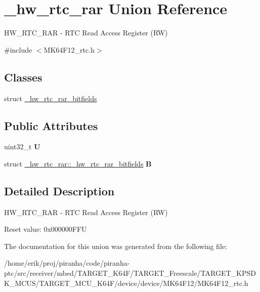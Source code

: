 \hypertarget{union__hw__rtc__rar}{}\section{\+\_\+hw\+\_\+rtc\+\_\+rar Union Reference}
\label{union__hw__rtc__rar}


H\+W\+\_\+\+R\+T\+C\+\_\+\+R\+AR -\/ R\+TC Read Access Register (RW)  




{\ttfamily \#include $<$M\+K64\+F12\+\_\+rtc.\+h$>$}

\subsection*{Classes}
\begin{DoxyCompactItemize}
\item 
struct \hyperlink{struct__hw__rtc__rar_1_1__hw__rtc__rar__bitfields}{\+\_\+hw\+\_\+rtc\+\_\+rar\+\_\+bitfields}
\end{DoxyCompactItemize}
\subsection*{Public Attributes}
\begin{DoxyCompactItemize}
\item 
uint32\+\_\+t {\bfseries U}\hypertarget{union__hw__rtc__rar_a61805dc7b156b5b3498e0d435c6ff2a7}{}\label{union__hw__rtc__rar_a61805dc7b156b5b3498e0d435c6ff2a7}

\item 
struct \hyperlink{struct__hw__rtc__rar_1_1__hw__rtc__rar__bitfields}{\+\_\+hw\+\_\+rtc\+\_\+rar\+::\+\_\+hw\+\_\+rtc\+\_\+rar\+\_\+bitfields} {\bfseries B}\hypertarget{union__hw__rtc__rar_a809f0614035c209c0d11aeaaadd1e29d}{}\label{union__hw__rtc__rar_a809f0614035c209c0d11aeaaadd1e29d}

\end{DoxyCompactItemize}


\subsection{Detailed Description}
H\+W\+\_\+\+R\+T\+C\+\_\+\+R\+AR -\/ R\+TC Read Access Register (RW) 

Reset value\+: 0x000000\+F\+FU 

The documentation for this union was generated from the following file\+:\begin{DoxyCompactItemize}
\item 
/home/erik/proj/piranha/code/piranha-\/ptc/src/receiver/mbed/\+T\+A\+R\+G\+E\+T\+\_\+\+K64\+F/\+T\+A\+R\+G\+E\+T\+\_\+\+Freescale/\+T\+A\+R\+G\+E\+T\+\_\+\+K\+P\+S\+D\+K\+\_\+\+M\+C\+U\+S/\+T\+A\+R\+G\+E\+T\+\_\+\+M\+C\+U\+\_\+\+K64\+F/device/device/\+M\+K64\+F12/M\+K64\+F12\+\_\+rtc.\+h\end{DoxyCompactItemize}
